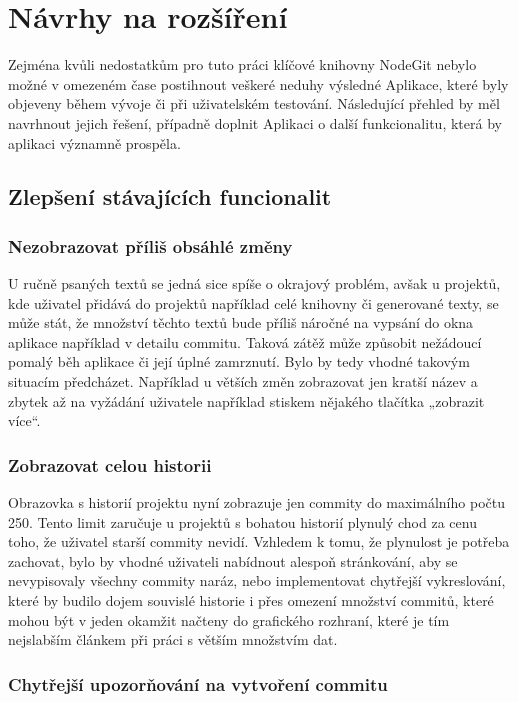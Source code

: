 \chapter{Návrhy na rozšíření}

Zejména kvůli nedostatkům pro tuto práci klíčové knihovny NodeGit nebylo možné v omezeném čase postihnout veškeré neduhy výsledné Aplikace, které byly objeveny během vývoje či při uživatelském testování. Následující přehled by měl navrhnout jejich řešení, případně doplnit Aplikaci o další funkcionalitu, která by aplikaci významně prospěla.


\section{Zlepšení stávajících funcionalit}

\subsection{Nezobrazovat příliš obsáhlé změny}

U ručně psaných textů se jedná sice spíše o okrajový problém, avšak u projektů, kde uživatel přidává do projektů například celé knihovny či generované texty, se může stát, že množství těchto textů bude příliš náročné na vypsání do okna aplikace například v detailu commitu. Taková zátěž může způsobit nežádoucí pomalý běh aplikace či její úplné zamrznutí. Bylo by tedy vhodné takovým situacím předcházet. Například u větších změn zobrazovat jen kratší název a zbytek až na vyžádání uživatele například stiskem nějakého tlačítka „zobrazit více“.

\subsection{Zobrazovat celou historii}

Obrazovka s historií projektu nyní zobrazuje jen commity do maximálního počtu 250. Tento limit zaručuje u projektů s bohatou historií plynulý chod za cenu toho, že uživatel starší commity nevidí. Vzhledem k tomu, že plynulost je potřeba zachovat, bylo by vhodné uživateli nabídnout alespoň stránkování, aby se nevypisovaly všechny commity naráz, nebo implementovat chytřejší vykreslování, které by budilo dojem souvislé historie i přes omezení množství commitů, které mohou být v jeden okamžit načteny do grafického rozhraní, které je tím nejslabším článkem při práci s větším množstvím dat.

\subsection{Chytřejší upozorňování na vytvoření commitu}

